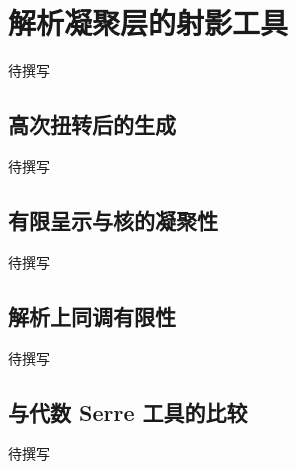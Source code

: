 
% 
% 

\section{解析凝聚层的射影工具}
\label{g4:sec:2003}

待撰写

\subsection{高次扭转后的生成}
\label{g4:subsec:2003:01}
待撰写

\subsection{有限呈示与核的凝聚性}
\label{g4:subsec:2003:02}
待撰写

\subsection{解析上同调有限性}
\label{g4:subsec:2003:03}
待撰写

\subsection{与代数 Serre 工具的比较}
\label{g4:subsec:2003:04}
待撰写
